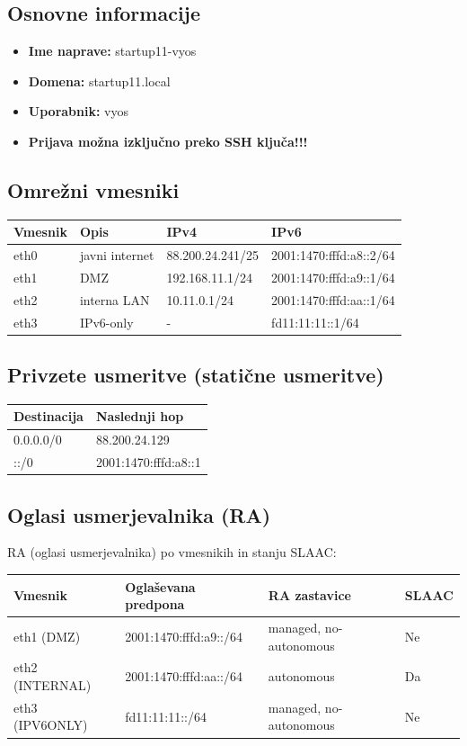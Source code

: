 \documentclass[a4paper,11pt]{article}
\begin{document}
\subsection{Osnovne informacije}
\begin{itemize}
    \item \textbf{Ime naprave:} startup11-vyos
    \item \textbf{Domena:} startup11.local
    \item \textbf{Uporabnik:} vyos 
    \item \textbf{Prijava možna izključno preko SSH ključa!!!}
\end{itemize}

\subsection{Omrežni vmesniki}
\begin{longtable}{|l|l|l|l|}
\hline
\textbf{Vmesnik} & \textbf{Opis} & \textbf{IPv4} & \textbf{IPv6} \\
\hline
eth0 & javni internet & 88.200.24.241/25 & 2001:1470:fffd:a8::2/64 \\
\hline
eth1 & DMZ & 192.168.11.1/24 & 2001:1470:fffd:a9::1/64 \\
\hline
eth2 & interna LAN & 10.11.0.1/24 & 2001:1470:fffd:aa::1/64 \\
\hline
eth3 & IPv6-only & - & fd11:11:11::1/64 \\
\hline
\end{longtable}

\subsection{Privzete usmeritve (statične usmeritve)}
\begin{longtable}{|l|l|}
\hline
\textbf{Destinacija} & \textbf{Naslednji hop} \\
\hline
0.0.0.0/0 & 88.200.24.129 \\
\hline
::/0 & 2001:1470:fffd:a8::1 \\
\hline
\end{longtable}

\subsection{Oglasi usmerjevalnika (RA)}
RA (oglasi usmerjevalnika) po vmesnikih in stanju SLAAC:
\begin{longtable}{|l|l|l|l|}
\hline
\textbf{Vmesnik} & \textbf{Oglaševana predpona} & \textbf{RA zastavice} & \textbf{SLAAC} \\
\hline
eth1 (DMZ) & 2001:1470:fffd:a9::/64 & managed, no-autonomous & Ne \\
eth2 (INTERNAL) & 2001:1470:fffd:aa::/64 & autonomous & Da \\ 
eth3 (IPV6ONLY) & fd11:11:11::/64 & managed, no-autonomous & Ne \\
\hline
\end{longtable}
\end{document}
